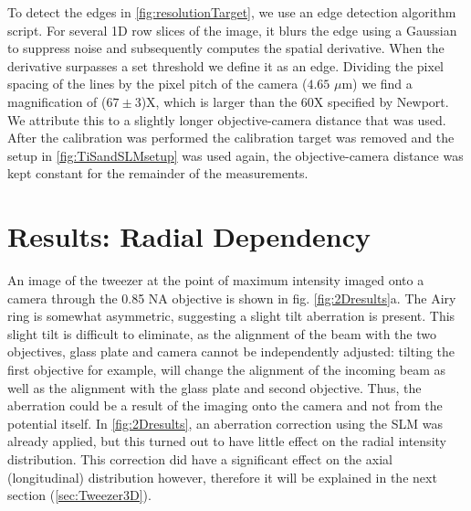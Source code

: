 To detect the edges in \cref{fig:resolutionTarget}, we use an edge detection algorithm script.
For several 1D row slices of the image, it blurs the edge using a Gaussian to suppress noise and subsequently computes the spatial derivative. 
When the derivative surpasses a set threshold we define it as an edge.
Dividing the pixel spacing of the lines by the pixel pitch of the camera ($4.65$ $\mu$m) we find a magnification of ($67 \pm 3$)X, which is larger than the 60X specified by Newport. 
We attribute this to a slightly longer objective-camera distance that was used. 
After the calibration was performed the calibration target was removed and the setup in \cref{fig:TiSandSLMsetup} was used again, the objective-camera distance was kept constant for the remainder of the measurements.

\section{Results: Radial Dependency}\label{sec:TweezerRadial}

An image of the tweezer at the point of maximum intensity imaged onto a camera through the 0.85 NA objective is shown in fig. \ref{fig:2Dresults}a. 
The Airy ring is somewhat asymmetric, suggesting a slight tilt aberration is present.
This slight tilt is difficult to eliminate, as the alignment of the beam with the two objectives, glass plate and camera cannot be independently adjusted: tilting the first objective for example, will change the alignment of the incoming beam as well as the alignment with the glass plate and second objective.
Thus, the aberration could be a result of the imaging onto the camera and not from the potential itself.
In \cref{fig:2Dresults}, an aberration correction using the \ac{SLM} was already applied, but this turned out to have little effect on the radial intensity distribution.
This correction did have a significant effect on the axial (longitudinal) distribution however, therefore it will be explained in the next section (\cref{sec:Tweezer3D}).

